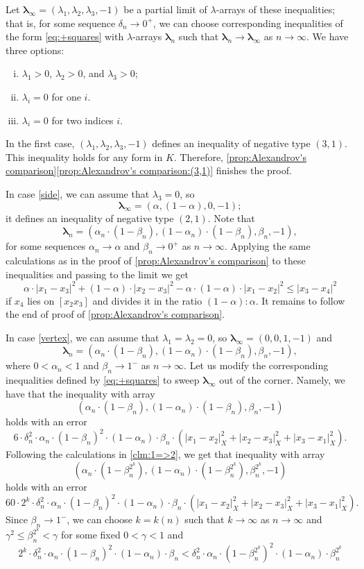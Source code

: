 \documentclass[a4paper,10pt]{article}
\begin{document}
Let $\bm{\lambda}_\infty=(\lambda_1,\lambda_2,\lambda_3,-1)$ be a partial limit of $\lambda$-arrays of these inequalities;
that is, for some sequence $\delta_n\to 0^+$, we can choose corresponding inequalities of the form \ref{eq:+squares} with $\lambda$-arrays $\bm{\lambda}_n$ such that $\bm{\lambda}_n\to \bm{\lambda}_\infty$ as $n\to \infty$.
We have three options:
\begin{enumerate}[(i)]
\item\label{in} $\lambda_1>0$, $\lambda_2>0$, and $\lambda_3>0$;
\item\label{side} $\lambda_i=0$ for one $i$.
\item\label{vertex} $\lambda_i=0$ for two indices $i$.
\end{enumerate}

In the first case,  $(\lambda_1,\lambda_2,\lambda_3,-1)$ defines an inequality of negative type $(3,1)$.
This inequality holds for any form in $K$.
Therefore, \ref{prop:Alexandrov's comparison}\ref{prop:Alexandrov's comparison:(3,1)} finishes the proof.

In case \ref{side}, we can assume that $\lambda_3=0$, so
\[\bm{\lambda}_\infty=(\alpha,(1-\alpha),0,-1);\]
it defines an inequality of negative type $(2,1)$.
Note that
\[\bm{\lambda}_n=(\alpha_n\cdot(1-\beta_n),(1-\alpha_n)\cdot(1-\beta_n),\beta_n,-1),\]
for some sequences $\alpha_n\to\alpha$ and $\beta_n\to 0^+$ as $n\to\infty$.
Applying the same calculations as in the proof of \ref{prop:Alexandrov's comparison} to these inequalities and passing to the limit we get
\[
\alpha\cdot|x_1-x_3|^2+(1-\alpha)\cdot|x_2-x_3|^2-\alpha\cdot (1-\alpha)\cdot|x_1-x_2|^2
\le
|x_3-x_4|^2
\]
if $x_4$ lies on $[x_2x_3]$ and divides it in the ratio $(1-\alpha):\alpha$.
It remains to follow the end of proof of \ref{prop:Alexandrov's comparison}.

In case \ref{vertex}, we can assume that $\lambda_1=\lambda_2=0$, so $\bm{\lambda}_\infty=(0,0,1,-1)$ and
\[\bm{\lambda}_n=(\alpha_n\cdot(1-\beta_n),(1-\alpha_n)\cdot(1-\beta_n),\beta_n,-1),\]
where $0<\alpha_n<1$ and $\beta_n\to 1^-$ as $n\to\infty$.
Let us modify the corresponding inequalities defined by \ref{eq:+squares} to sweep $\bm{\lambda}_\infty$ out of the corner.
Namely, we have that the inequality with array
\[(\alpha_n\cdot(1-\beta_n),(1-\alpha_n)\cdot(1-\beta_n),\beta_n,-1)\]
holds with an error
\[6\cdot\delta_n^2\cdot\alpha_n\cdot(1-\beta_n)^2\cdot(1-\alpha_n)\cdot\beta_n \cdot (|x_1-x_2|_X^2+|x_2-x_3|_X^2+|x_3-x_1|_X^2).\]
Following the calculations in \ref{clm:1=>2}, we get that inequality with array
\[(\alpha_n\cdot(1-\beta_n^{2^k}),(1-\alpha_n)\cdot(1-\beta_n^{2^k}),\beta_n^{2^k},-1)\]
holds with an error
\[60\cdot2^k\cdot\delta_n^2\cdot\alpha_n\cdot(1-\beta_n)^2\cdot(1-\alpha_n)\cdot\beta_n \cdot (|x_1-x_2|_X^2+|x_2-x_3|_X^2+|x_3-x_1|_X^2).\]
Since $\beta_n\to 1^-$, we can choose $k=k(n)$ such that $k\to \infty$ as $n\to \infty$ and $\gamma^2\le \beta_n^{2^k}<\gamma$ for some fixed $0<\gamma<1$ and
\[
2^k\cdot\delta_n^2\cdot \alpha_n\cdot(1-\beta_n)^2\cdot(1-\alpha_n)\cdot\beta_n
<
\delta_n^2\cdot \alpha_n\cdot(1-\beta_n^{2^k})^2\cdot(1-\alpha_n)\cdot\beta_n^{2^k}
\]
\end{document}

